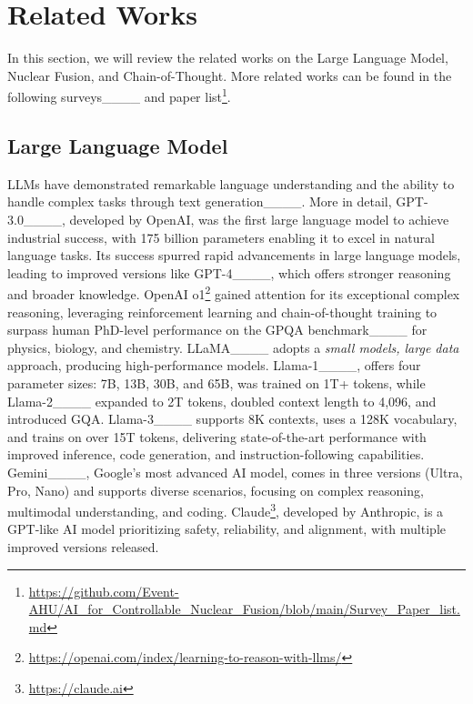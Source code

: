 \section{Related Works}
\label{relatedWorks}

In this section, we will review the related works on the Large Language Model, Nuclear Fusion, and Chain-of-Thought. More related works can be found in the following surveys____ and paper list\footnote{\url{https://github.com/Event-AHU/AI_for_Controllable_Nuclear_Fusion/blob/main/Survey_Paper_list.md}}.  



\subsection{Large Language Model}  
LLMs have demonstrated remarkable language understanding and the ability to handle complex tasks through text generation____. 
More in detail, GPT-3.0____, developed by OpenAI, was the first large language model to achieve industrial success, with 175 billion parameters enabling it to excel in natural language tasks. Its success spurred rapid advancements in large language models, leading to improved versions like GPT-4____, which offers stronger reasoning and broader knowledge. OpenAI o1\footnote{\url{https://openai.com/index/learning-to-reason-with-llms/}} gained attention for its exceptional complex reasoning, leveraging reinforcement learning and chain-of-thought training to surpass human PhD-level performance on the GPQA benchmark____ for physics, biology, and chemistry. LLaMA____ adopts a \textit{small models, large data} approach, producing high-performance models. Llama-1____, offers four parameter sizes: 7B, 13B, 30B, and 65B, was trained on 1T+ tokens, while Llama-2____ expanded to 2T tokens, doubled context length to 4,096, and introduced GQA. Llama-3____ supports 8K contexts, uses a 128K vocabulary, and trains on over 15T tokens, delivering state-of-the-art performance with improved inference, code generation, and instruction-following capabilities. Gemini____, Google's most advanced AI model, comes in three versions (Ultra, Pro, Nano) and supports diverse scenarios, focusing on complex reasoning, multimodal understanding, and coding. Claude\footnote{\url{https://claude.ai}}, developed by Anthropic, is a GPT-like AI model prioritizing safety, reliability, and alignment, with multiple improved versions released. 


